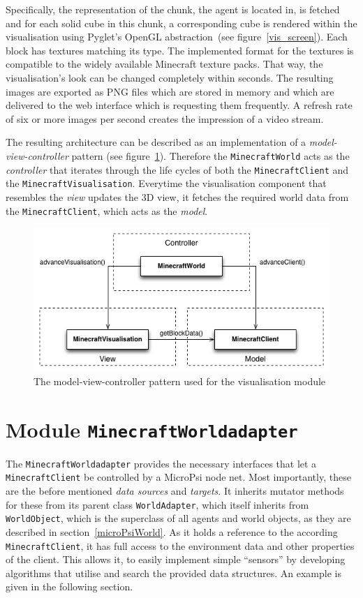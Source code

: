 Specifically, the representation of the chunk, the agent is located in, is fetched and for each solid cube in this chunk, a corresponding cube is rendered within the visualisation using Pyglet's OpenGL abstraction~(see figure~\ref{vis_screen}). Each block has textures matching its type. The implemented format for the textures is compatible to the widely available Minecraft texture packs. That way, the visualisation's look can be changed completely within seconds. The resulting images are exported as PNG files which are stored in memory and which are delivered to the web interface which is requesting them frequently. A refresh rate of six or more images per second creates the impression of a video stream.

The resulting architecture can be described as an implementation of a \emph{model-view-controller} pattern (see figure~\ref{mvc}). Therefore the \texttt{MinecraftWorld} acts as the \emph{controller} that iterates through the life cycles of both the \texttt{MinecraftClient} and the \texttt{MinecraftVisualisation}. Everytime the visualisation component that resembles the \emph{view} updates the 3D view, it fetches the required world data from the \texttt{MinecraftClient}, which acts as the \emph{model}.

\begin{figure}[h]
  \centering
    \includegraphics[width=12cm]{graphics/mvc}
  \caption{The model-view-controller pattern used for the visualisation module}
  \label{mvc}
\end{figure}

    \section{Module \texttt{MinecraftWorldadapter}}


The \texttt{MinecraftWorldadapter} provides the necessary interfaces that let a \texttt{MinecraftClient} be controlled by a MicroPsi node net. Most importantly, these are the before mentioned \emph{data sources} and \emph{targets}. It inherits mutator methods for these from its parent class \texttt{WorldAdapter}, which itself inherits from \texttt{WorldObject}, which is the superclass of all agents and world objects, as they are described in section~\ref{microPsiWorld}. As it holds a reference to the according \texttt{MinecraftClient}, it has full access to the environment data and other properties of the client. This allows it, to easily implement simple ``sensors'' by developing algorithms that utilise and search the provided data structures. An example is given in the following section.
    
